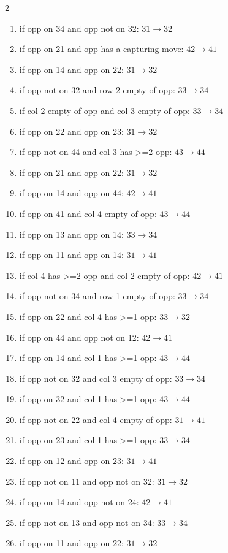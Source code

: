 \begin{multicols}{2}
\begin{tikzpicture}[scale=0.24]
\end{tikzpicture}
\nopagebreak\begin{enumerate}[topsep=1pt,itemsep=0pt,parsep=0pt,leftmargin=2.2em,label=\arabic*.]
\item if opp on 34 and opp not on 32: $31\!\to\!32$
\item if opp on 21 and opp has a capturing move: $42\!\to\!41$
\item if opp on 14 and opp on 22: $31\!\to\!32$
\item if opp not on 32 and row 2 empty of opp: $33\!\to\!34$
\item if col 2 empty of opp and col 3 empty of opp: $33\!\to\!34$
\item if opp on 22 and opp on 23: $31\!\to\!32$
\item if opp not on 44 and col 3 has >=2 opp: $43\!\to\!44$
\item if opp on 21 and opp on 22: $31\!\to\!32$
\item if opp on 14 and opp on 44: $42\!\to\!41$
\item if opp on 41 and col 4 empty of opp: $43\!\to\!44$
\item if opp on 13 and opp on 14: $33\!\to\!34$
\item if opp on 11 and opp on 14: $31\!\to\!41$
\item if col 4 has >=2 opp and col 2 empty of opp: $42\!\to\!41$
\item if opp not on 34 and row 1 empty of opp: $33\!\to\!34$
\item if opp on 22 and col 4 has >=1 opp: $33\!\to\!32$
\item if opp on 44 and opp not on 12: $42\!\to\!41$
\item if opp on 14 and col 1 has >=1 opp: $43\!\to\!44$
\item if opp not on 32 and col 3 empty of opp: $33\!\to\!34$
\item if opp on 32 and col 1 has >=1 opp: $43\!\to\!44$
\item if opp not on 22 and col 4 empty of opp: $31\!\to\!41$
\item if opp on 23 and col 1 has >=1 opp: $33\!\to\!34$
\item if opp on 12 and opp on 23: $31\!\to\!41$
\item if opp not on 11 and opp not on 32: $31\!\to\!32$
\item if opp on 14 and opp not on 24: $42\!\to\!41$
\item if opp not on 13 and opp not on 34: $33\!\to\!34$
\item if opp on 11 and opp on 22: $31\!\to\!32$

\end{enumerate}
\end{multicols}
